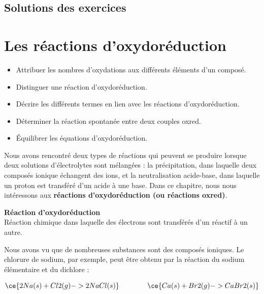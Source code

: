 \documentclass[
  11pt,
  a4paper,
  openany]{book}
\providecommand{\tightlist}{%
  \setlength{\itemsep}{0pt}\setlength{\parskip}{0pt}}
\begin{document}
\clearpage

\section{Solutions des exercices} \shipoutAnswer

\chapter{Les réactions d'oxydoréduction}\label{les-ruxe9actions-doxydoruxe9duction}

\begin{objectives}

\begin{itemize}
\tightlist
\item
  Attribuer les nombres d'oxydations aux différents éléments d'un composé.
\item
  Distinguer une réaction d'oxydoréduction.
\item
  Décrire les différents termes en lien avec les réactions d'oxydoréduction.
\item
  Déterminer la réaction spontanée entre deux couples oxred.
\item
  Équilibrer les équations d'oxydoréduction.
\end{itemize}

\end{objectives}

Nous avons rencontré deux types de réactions qui peuvent se produire lorsque deux solutions d'électrolytes sont mélangées : la précipitation, dans laquelle deux composés ionique échangent des ions, et la neutralisation acide-base, dans laquelle un proton est transféré d'un acide à une base. Dans ce chapitre, nous nous intéressons aux \textbf{réactions d'oxydoréduction (ou réactions oxred)}.

\begin{tcolorbox}
\textbf{Réaction d'oxydoréduction}\\
Réaction chimique dans laquelle des électrons sont transférés d'un réactif à un autre.

\end{tcolorbox}

Nous avons vu que de nombreuses substances sont des composés ioniques. Le chlorure de sodium, par exemple, peut être obtenu par la réaction du sodium élémentaire et du dichlore :

\[
\ce{ 2 Na(s) + Cl2(g) -> 2 NaCl(s) } \qquad \qquad \ce{ Ca(s) + Br2(g) -> CaBr2(s) }
\]
\end{document}
